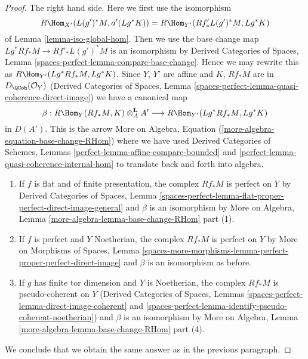 \begin{proof}
\medskip\noindent
The right hand side. Here we first use the isomorphism
$$
R\Hom_{X'}(L(g')^*M, a'(Lg^*K)) = R\Hom_{Y'}(Rf'_*L(g')^*M, Lg^*K)
$$
of Lemma \ref{lemma-iso-global-hom}. Then we use the base change
map $Lg^*Rf_*M \to Rf'_*L(g')^*M$ is an isomorphism by
Derived Categories of Spaces, Lemma
\ref{spaces-perfect-lemma-compare-base-change}.
Hence we may rewrite this as $R\Hom_{Y'}(Lg^*Rf_*M, Lg^*K)$.
Since $Y$, $Y'$ are affine and $K$, $Rf_*M$ are in $D_\QCoh(\mathcal{O}_Y)$
(Derived Categories of Spaces, Lemma
\ref{spaces-perfect-lemma-quasi-coherence-direct-image})
we have a canonical map
$$
\beta :
R\Hom_Y(Rf_*M, K) \otimes^\mathbf{L}_A A'
\longrightarrow
R\Hom_{Y'}(Lg^*Rf_*M, Lg^*K)
$$
in $D(A')$. This is the arrow
More on Algebra, Equation (\ref{more-algebra-equation-base-change-RHom})
where we have used Derived Categories of Schemes, Lemmas
\ref{perfect-lemma-affine-compare-bounded} and
\ref{perfect-lemma-quasi-coherence-internal-hom}
to translate back and forth into algebra.
\begin{enumerate}
\item If $f$ is flat and of finite presentation, the complex $Rf_*M$
is perfect on $Y$ by Derived Categories of Spaces, Lemma
\ref{spaces-perfect-lemma-flat-proper-perfect-direct-image-general}
and $\beta$ is an isomorphism by
More on Algebra, Lemma \ref{more-algebra-lemma-base-change-RHom} part (1).
\item If $f$ is perfect and $Y$ Noetherian, the complex $Rf_*M$
is perfect on $Y$ by More on Morphisms of Spaces, Lemma
\ref{spaces-more-morphisms-lemma-perfect-proper-perfect-direct-image}
and $\beta$ is an isomorphism as before.
\item If $g$ has finite tor dimension and $Y$ is Noetherian,
the complex $Rf_*M$ is pseudo-coherent on $Y$
(Derived Categories of Spaces, Lemmas
\ref{spaces-perfect-lemma-direct-image-coherent} and
\ref{spaces-perfect-lemma-identify-pseudo-coherent-noetherian})
and $\beta$ is an isomorphism by
More on Algebra, Lemma \ref{more-algebra-lemma-base-change-RHom} part (4).
\end{enumerate}
We conclude that we obtain the same answer as in the previous paragraph.


\end{proof}
